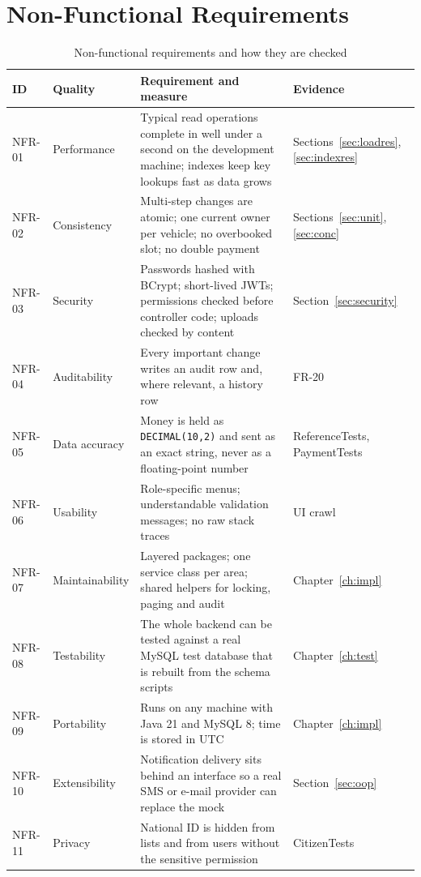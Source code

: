 \section{Non-Functional Requirements}
\begin{table}[H]
\centering\small
\caption{Non-functional requirements and how they are checked}\label{tab:nfr}
\begin{tabularx}{\linewidth}{@{}p{1.3cm}p{3.0cm}Xp{2.4cm}@{}}
\toprule \textbf{ID} & \textbf{Quality} & \textbf{Requirement and measure} & \textbf{Evidence}\\ \midrule
NFR-01 & Performance & Typical read operations complete in well under a second on the development machine; indexes keep key lookups fast as data grows & Sections~\ref{sec:loadres}, \ref{sec:indexres}\\
NFR-02 & Consistency & Multi-step changes are atomic; one current owner per vehicle; no overbooked slot; no double payment & Sections~\ref{sec:unit}, \ref{sec:conc}\\
NFR-03 & Security & Passwords hashed with BCrypt; short-lived JWTs; permissions checked before controller code; uploads checked by content & Section~\ref{sec:security}\\
NFR-04 & Auditability & Every important change writes an audit row and, where relevant, a history row & FR-20\\
NFR-05 & Data accuracy & Money is held as \texttt{DECIMAL(10,2)} and sent as an exact string, never as a floating-point number & ReferenceTests, PaymentTests\\
NFR-06 & Usability & Role-specific menus; understandable validation messages; no raw stack traces & UI crawl\\
NFR-07 & Maintainability & Layered packages; one service class per area; shared helpers for locking, paging and audit & Chapter~\ref{ch:impl}\\
NFR-08 & Testability & The whole backend can be tested against a real MySQL test database that is rebuilt from the schema scripts & Chapter~\ref{ch:test}\\
NFR-09 & Portability & Runs on any machine with Java 21 and MySQL 8; time is stored in UTC & Chapter~\ref{ch:impl}\\
NFR-10 & Extensibility & Notification delivery sits behind an interface so a real SMS or e-mail provider can replace the mock & Section~\ref{sec:oop}\\
NFR-11 & Privacy & National ID is hidden from lists and from users without the sensitive permission & Citizen\allowbreak{}Tests\\
\bottomrule
\end{tabularx}
\end{table}

